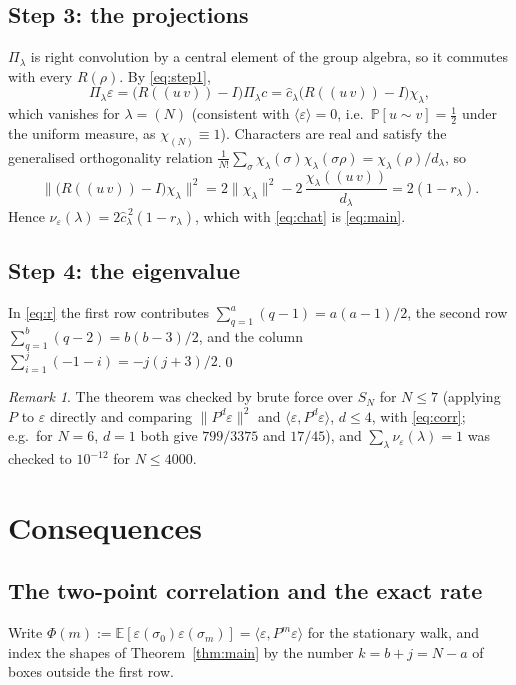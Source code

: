 \documentclass[11pt]{amsart}
\theoremstyle{remark}
\newtheorem{remark}[theorem]{Remark}
\newcommand{\E}{\mathbb{E}}
\renewcommand{\Pr}{\mathbb{P}}
\newcommand{\SN}{S_N}
\begin{document}
\subsection*{Step 3: the projections}
$\Pi_\lambda$ is right convolution by a central element of the group algebra, so it commutes with every $R(\rho)$.  By \eqref{eq:step1},
\[
\Pi_\lambda\varepsilon=\bigl(R((u\,v))-I\bigr)\Pi_\lambda c=\hat c_\lambda\bigl(R((u\,v))-I\bigr)\chi_\lambda ,
\]
which vanishes for $\lambda=(N)$ (consistent with $\langle\varepsilon\rangle=0$, i.e.\ $\Pr[u\sim v]=\tfrac12$ under the uniform measure, as $\chi_{(N)}\equiv1$).  Characters are real and satisfy the generalised orthogonality relation $\frac1{N!}\sum_\sigma\chi_\lambda(\sigma)\chi_\lambda(\sigma\rho)=\chi_\lambda(\rho)/d_\lambda$, so
\[
\bigl\|\bigl(R((u\,v))-I\bigr)\chi_\lambda\bigr\|^2
=2\|\chi_\lambda\|^2-2\,\frac{\chi_\lambda((u\,v))}{d_\lambda}=2(1-r_\lambda).
\]
Hence $\nu_\varepsilon(\lambda)=2\hat c_\lambda^{\,2}(1-r_\lambda)$, which with \eqref{eq:chat} is \eqref{eq:main}.

\subsection*{Step 4: the eigenvalue}
In \eqref{eq:r} the first row contributes $\sum_{q=1}^a(q-1)=a(a-1)/2$, the second row $\sum_{q=1}^b(q-2)=b(b-3)/2$, and the column $\sum_{i=1}^j(-1-i)=-j(j+3)/2$.\qed

\begin{remark}
The theorem was checked by brute force over $\SN$ for $N\le7$ (applying $P$ to $\varepsilon$ directly and comparing $\|P^d\varepsilon\|^2$ and $\langle\varepsilon,P^d\varepsilon\rangle$, $d\le4$, with \eqref{eq:corr}; e.g.\ for $N=6$, $d=1$ both give $799/3375$ and $17/45$), and $\sum_\lambda\nu_\varepsilon(\lambda)=1$ was checked to $10^{-12}$ for $N\le4000$.
\end{remark}

\section{Consequences}\label{sec:cons}

\subsection{The two-point correlation and the exact rate}

Write $\Phi(m):=\E[\varepsilon(\sigma_0)\varepsilon(\sigma_m)]=\langle\varepsilon,P^m\varepsilon\rangle$ for the stationary walk, and index the shapes of Theorem~\ref{thm:main} by the number $k=b+j=N-a$ of boxes outside the first row.
\end{document}
